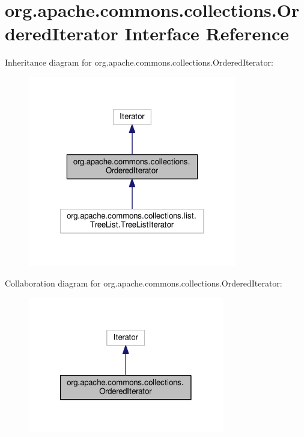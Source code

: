 \section{org.\-apache.\-commons.\-collections.\-Ordered\-Iterator Interface Reference}
\label{interfaceorg_1_1apache_1_1commons_1_1collections_1_1_ordered_iterator}


Inheritance diagram for org.\-apache.\-commons.\-collections.\-Ordered\-Iterator\-:
\nopagebreak
\begin{figure}[H]
\begin{center}
\leavevmode
\includegraphics[width=258pt]{interfaceorg_1_1apache_1_1commons_1_1collections_1_1_ordered_iterator__inherit__graph}
\end{center}
\end{figure}


Collaboration diagram for org.\-apache.\-commons.\-collections.\-Ordered\-Iterator\-:
\nopagebreak
\begin{figure}[H]
\begin{center}
\leavevmode
\includegraphics[width=242pt]{interfaceorg_1_1apache_1_1commons_1_1collections_1_1_ordered_iterator__coll__graph}
\end{center}
\end{figure}
